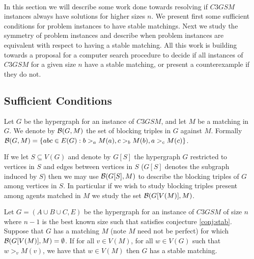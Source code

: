 \paragraph{}
In this section we will describe some work done towards resolving if $C3GSM$ instances always have solutions for higher sizes $n$. We present first some sufficient conditions for problem instances to have stable matchings. Next we study the symmetry of problem instances and describe when problem instances are equivalent with respect to having a stable matching. All this work is building towards a proposal for a computer search procedure to decide if all instances of $C3GSM$ for a given size $n$ have a stable matching, or present a counterexample if they do not.
\subsection{Sufficient Conditions}\label{subsec:sufficient}
\begin{definition}
Let $G$ be the hypergraph for an instance of $C3GSM$, and let $M$ be a matching in $G$. We denote by $\mathcal{B}(G,M)$ the set of blocking triples in $G$ against $M$. Formally $\mathcal{B}(G,M) = \{abc \in E(G): b>_a M(a), c>_b M(b), a>_c M(c)\}$.
\end{definition}
\begin{note}
If we let $S \subseteq V(G)$ and denote by $G[S]$ the hypergraph $G$ restricted to vertices in $S$ and edges between vertices in $S$ ($G[S]$ denotes the subgraph induced by $S$) then we may use $\mathcal{B}(G[S],M)$ to describe the blocking triples of $G$ among vertices in $S$. In particular if we wish to study blocking triples present among agents matched in $M$ we study the set $\mathcal{B}(G[V(M)], M)$.
\end{note}
\begin{lemma}\label{lemma:partialstab}
Let $G = (A\cup B \cup C, E)$ be the hypergraph for an instance of $C3GSM$ of size $n$ where $n-1$ is the best known size such that  satisfies conjecture \ref{conj:stab}. Suppose that $G$ has a matching $M$ (note $M$ need not be perfect) for which $\mathcal{B}(G[V(M)],M) = \emptyset$. If for all  $v \in V(M)$, for all $w \in V(G)$ such that $w >_v M(v)$, we have that $w \in V(M)$ then $G$ has a stable matching.
\end{lemma}
